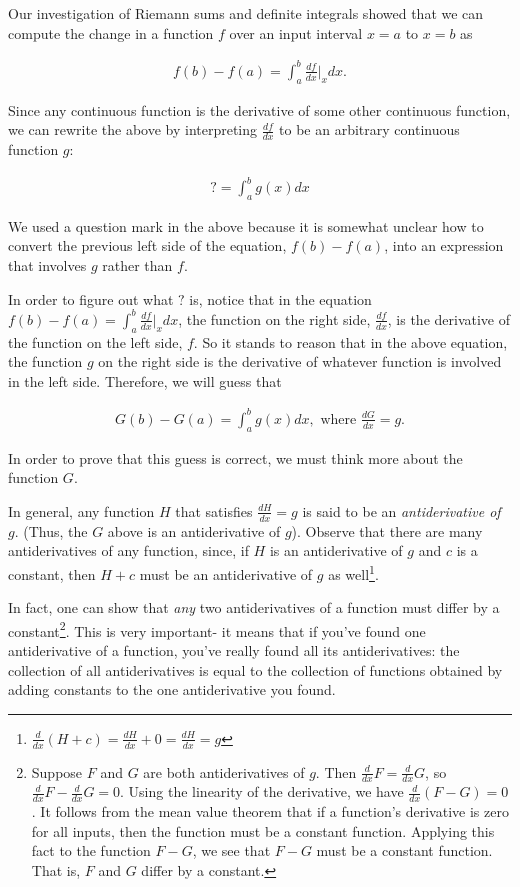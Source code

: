 \documentclass{article}
\begin{document}
Our investigation of Riemann sums and definite integrals showed that we can compute the change in a function $f$ over an input interval $x = a$ to $x = b$ as

\begin{align*}
    f(b) - f(a) = \int_a^b \frac{df}{dx}\Big|_x dx.
\end{align*}

Since any continuous function is the derivative of some other continuous function, we can rewrite the above by interpreting $\frac{df}{dx}$ to be an arbitrary continuous function $g$:

\begin{align*}
    ? = \int_a^b g(x) dx
\end{align*}

We used a question mark in the above because it is somewhat unclear how to convert the previous left side of the equation, $f(b) - f(a)$, into an expression that involves $g$ rather than $f$.

In order to figure out what $?$ is, notice that in the equation $f(b) - f(a) = \int_a^b \frac{df}{dx}\Big|_x dx$, the function on the right side, $\frac{df}{dx}$, is the derivative of the function on the left side, $f$. So it stands to reason that in the above equation, the function $g$ on the right side is the derivative of whatever function is involved in the left side. Therefore, we will guess that

\begin{align*}
    G(b) - G(a) = \int_a^b g(x) dx , \text{ where $\frac{dG}{dx} = g$}.
\end{align*}

In order to prove that this guess is correct, we must think more about the function $G$.

In general, any function $H$ that satisfies $\frac{dH}{dx} = g$ is said to be an \textit{antiderivative of $g$}. (Thus, the $G$ above is an antiderivative of $g$). Observe that there are many antiderivatives of any function, since, if $H$ is an antiderivative of $g$ and $c$ is a constant, then $H + c$ must be an antiderivative of $g$ as well\footnote{$\frac{d}{dx}(H + c) = \frac{dH}{dx} + 0 = \frac{dH}{dx} = g$}. 

In fact, one can show that \textit{any} two antiderivatives of a function must differ by a constant\footnote{Suppose $F$ and $G$ are both antiderivatives of $g$. Then $\frac{d}{dx}F = \frac{d}{dx}G$, so $\frac{d}{dx}F - \frac{d}{dx}G = 0$. Using the linearity of the derivative, we have $\frac{d}{dx}(F - G) = 0$. It follows from the mean value theorem that if a function's derivative is zero for all inputs, then the function must be a constant function. Applying this fact to the function $F - G$, we see that $F - G$ must be a constant function. That is, $F$ and $G$ differ by a constant.}. This is very important- it means that if you've found one antiderivative of a function, you've really found all its antiderivatives: the collection of all antiderivatives is equal to the collection of functions obtained by adding constants to the one antiderivative you found.
\end{document}
